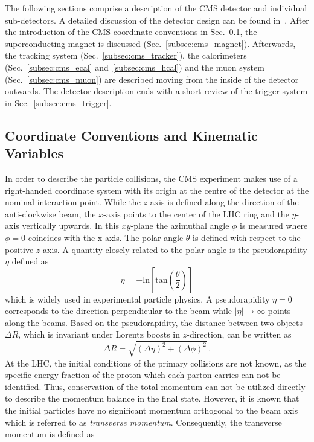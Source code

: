 The following sections comprise a description of the CMS detector and individual sub-detectors. A detailed discussion of the detector design can be found in~\cite{Chatrchyan:2008zzk, bib:cmsptdr1}. After the introduction of the CMS coordinate conventions in Sec.~\ref{subsec:cms_coordinates}, the superconducting magnet is discussed (Sec.~\ref{subsec:cms_magnet}). Afterwards, the tracking system (Sec.~\ref{subsec:cms_tracker}), the calorimeters (Sec.~\ref{subsec:cms_ecal} and~\ref{subsec:cms_hcal}) and the muon system (Sec.~\ref{subsec:cms_muon}) are described moving from the inside of the detector outwards. The detector description ends with a short review of the trigger system in Sec.~\ref{subsec:cms_trigger}.  

\subsection{Coordinate Conventions and Kinematic Variables}
\label{subsec:cms_coordinates}
In order to describe the particle collisions, the CMS experiment makes use of a right-handed coordinate system with its origin at the centre of the detector at the nominal interaction point. While the $z$-axis is defined along the direction of the anti-clockwise beam, the $x$-axis points to the center of the LHC ring and the $y$-axis vertically upwards. In this $xy$-plane the azimuthal angle $\phi$ is measured where $\phi = 0$ coincides with the x-axis. The polar angle $\theta$ is defined with respect to the positive $z$-axis. A quantity closely related to the polar angle is the pseudorapidity $\eta$ defined as
\begin{equation}
\eta = \mathrm{-ln} \left[\mathrm{tan} \left(\frac{\theta}{2} \right)\right]
\end{equation}
which is widely used in experimental particle physics. A pseudorapidity $\eta = 0$ corresponds to the direction perpendicular to the beam while $|\eta| \rightarrow \infty$ points along the beams. Based on the pseudorapidity, the distance between two objects $\Delta R$, which is invariant under Lorentz boosts in $z$-direction, can be written as
\begin{equation}
\Delta R = \sqrt{(\Delta \eta)^2 + (\Delta \phi)^2} \, .
\end{equation}
At the LHC, the initial conditions of the primary collisions are not known, as the specific energy fraction of the proton which each parton carries can not be identified. Thus, conservation of the total momentum can not be utilized directly to describe the momentum balance in the final state. However, it is known that the initial particles have no significant momentum orthogonal to the beam axis which is referred to as \textit{transverse momentum}. Consequently, the transverse momentum is defined as 

